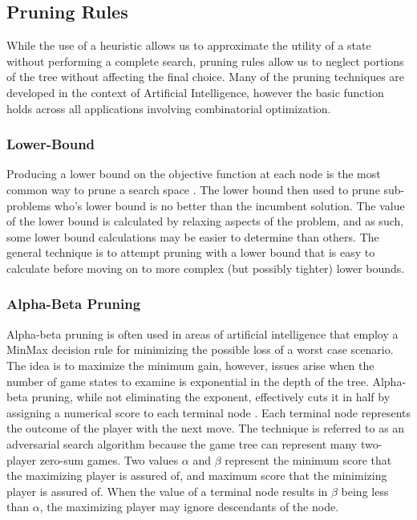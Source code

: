 
\subsection{Pruning Rules}
	While the use of a heuristic allows us to approximate the utility of a state without performing a complete search, pruning rules allow us to neglect portions of the tree without affecting the final choice. 
	Many of the pruning techniques are developed in the context of Artificial Intelligence, however the basic function holds across all applications involving combinatorial optimization. 
	\subsubsection{Lower-Bound}
		Producing a lower bound on the objective function at each node is the most common way to prune a search space \cite{morrison2016branch}. 
		The lower bound then used to prune sub-problems who's lower bound is no better than the incumbent solution. 
		The value of the lower bound is calculated by relaxing aspects of the problem, and as such, some lower bound calculations may be easier to determine than others. 
		The general technique is to attempt pruning with a lower bound that is easy to calculate before moving on to more complex (but possibly tighter) lower bounds. 
	\subsubsection{Alpha-Beta Pruning}
		Alpha-beta pruning is often used in areas of artificial intelligence that employ a MinMax decision rule for minimizing the possible loss of a worst case scenario. 
		The idea is to maximize the minimum gain, however, issues arise when the number of game states to examine is exponential in the depth of the tree. 
		Alpha-beta pruning, while not eliminating the exponent, effectively cuts it in half by assigning a numerical score to each terminal node \cite{russell2010artificial}. 
		Each terminal node represents the outcome of the player with the next move.
		The technique is referred to as an adversarial search algorithm because the game tree can represent many two-player zero-sum games. 
		Two values $\alpha$ and $\beta$ represent the minimum score that the maximizing player is assured of, and maximum score that the minimizing player is assured of. 
		When the value of a terminal node results in $\beta$ being less than $\alpha$, the maximizing player may ignore descendants of the node.  
